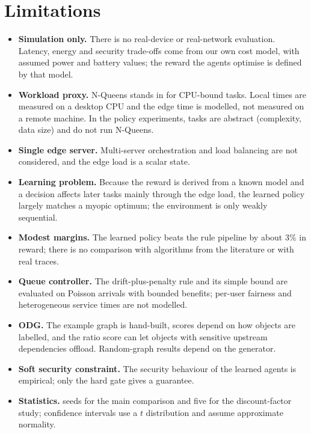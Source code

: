 \documentclass{ieeeaccess}
\begin{document}
\section{Limitations}
\label{sec:limitations}
\begin{itemize}
\item \textbf{Simulation only.} There is no real-device or real-network evaluation. Latency, energy and security trade-offs come from our own cost model, with assumed power and battery values; the reward the agents optimise is defined by that model.
\item \textbf{Workload proxy.} N-Queens stands in for CPU-bound tasks. Local times are measured on a desktop CPU and the edge time is modelled, not measured on a remote machine. In the policy experiments, tasks are abstract (complexity, data size) and do not run N-Queens.
\item \textbf{Single edge server.} Multi-server orchestration and load balancing are not considered, and the edge load is a scalar state.
\item \textbf{Learning problem.} Because the reward is derived from a known model and a decision affects later tasks mainly through the edge load, the learned policy largely matches a myopic optimum; the environment is only weakly sequential.
\item \textbf{Modest margins.} The learned policy beats the rule pipeline by about 3\% in reward; there is no comparison with algorithms from the literature or with real traces.
\item \textbf{Queue controller.} The drift-plus-penalty rule and its simple bound are evaluated on Poisson arrivals with bounded benefits; per-user fairness and heterogeneous service times are not modelled.
\item \textbf{ODG.} The example graph is hand-built, scores depend on how objects are labelled, and the ratio score can let objects with sensitive upstream dependencies offload. Random-graph results depend on the generator.
\item \textbf{Soft security constraint.} The security behaviour of the learned agents is empirical; only the hard gate gives a guarantee.
\item \textbf{Statistics.} \NSeeds{} seeds for the main comparison and five for the discount-factor study; confidence intervals use a $t$ distribution and assume approximate normality.
\end{itemize}
\end{document}
